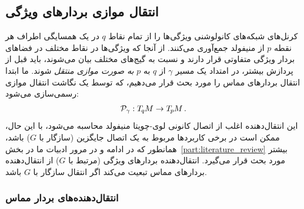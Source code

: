 

\subsection{انتقال موازی بردارهای ویژگی}
\label{sec:transport_local}

کرنل‌های شبکه‌های کانولوشنی ویژگی‌ها را از تمام نقاط $q$ در یک همسایگی اطراف هر نقطه $p$ از منیفولد جمع‌آوری می‌کنند.
از آنجا که ویژگی‌ها در نقاط مختلف در فضاهای بردار ویژگی متفاوتی قرار دارند و نسبت به گیج‌های مختلف بیان می‌شوند، باید قبل از پردازش بیشتر، در امتداد یک مسیر $\gamma$ از $q$ به $p$ \emph{به صورت موازی منتقل} شوند.
ما ابتدا انتقال بردارهای مماس را مورد بحث قرار می‌دهیم، که توسط یک نگاشت انتقال موازی رسمی‌سازی می‌شود:
\begin{align}
	\mathcal{P}_\gamma: T_{\mkern-1.5mu q}\mkern-.5muM \to T_{\mkern-1.5mu p}\mkern-.5muM \,.
\end{align}
این انتقال‌دهنده اغلب از اتصال کانونی لوی-چویتا منیفولد محاسبه می‌شود، با این حال، ممکن است در برخی کاربردها مربوط به یک اتصال جایگزین (سازگار با $G$) باشد، همانطور که در ادامه و در مرور ادبیات ما در بخش~\ref{part:literature_review} بیشتر مورد بحث قرار می‌گیرد.
انتقال‌دهنده بردارهای ویژگی (مرتبط با $G$) از انتقال‌دهنده بردارهای مماس تبعیت می‌کند اگر انتقال سازگار با $G$ باشد.


\subsubsection{انتقال‌دهنده‌های بردار مماس}

